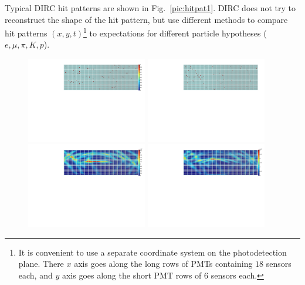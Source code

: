 Typical \gluex DIRC hit patterns are shown in Fig.~\ref{pic:hitpat1}. DIRC does not try to reconstruct the shape of the hit pattern, but use different methods to compare hit patterns $(x,y,t)$\footnote{It is convenient to use a separate coordinate system on the photodetection plane. There $x$ axis goes along the long rows of PMTs containing $18$ sensors each, and $y$ axis goes along the short PMT rows of $6$ sensors each.} to expectations for different particle hypotheses ($e, \mu, \pi, K, p$).

\begin{figure}[!h]
\centering
\includegraphics[angle=0,width=0.47\textwidth]{pics/kaon2GeVa.pdf} \hspace{0.5cm} \includegraphics[angle=0,width=0.47\textwidth]{pics/pion2GeVa.pdf}\\
\includegraphics[angle=0,width=0.47\textwidth]{pics/kaons2GeV.pdf} \hspace{0.5cm} \includegraphics[angle=0,width=0.47\textwidth]{pics/pions2GeV.pdf}

\end{figure}

